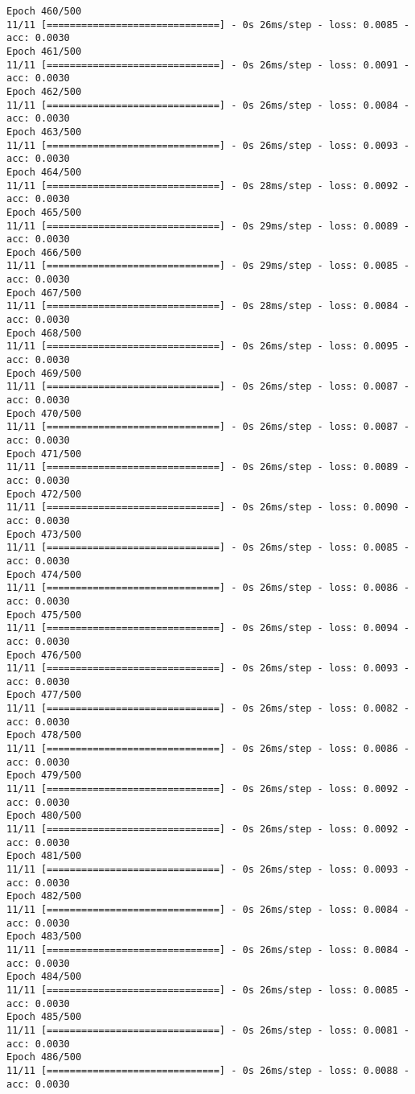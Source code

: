 \documentclass[11pt]{article}
\begin{document}
\begin{Verbatim}[commandchars=\\\{\}]
Epoch 460/500
11/11 [==============================] - 0s 26ms/step - loss: 0.0085 - acc: 0.0030
Epoch 461/500
11/11 [==============================] - 0s 26ms/step - loss: 0.0091 - acc: 0.0030
Epoch 462/500
11/11 [==============================] - 0s 26ms/step - loss: 0.0084 - acc: 0.0030
Epoch 463/500
11/11 [==============================] - 0s 26ms/step - loss: 0.0093 - acc: 0.0030
Epoch 464/500
11/11 [==============================] - 0s 28ms/step - loss: 0.0092 - acc: 0.0030
Epoch 465/500
11/11 [==============================] - 0s 29ms/step - loss: 0.0089 - acc: 0.0030
Epoch 466/500
11/11 [==============================] - 0s 29ms/step - loss: 0.0085 - acc: 0.0030
Epoch 467/500
11/11 [==============================] - 0s 28ms/step - loss: 0.0084 - acc: 0.0030
Epoch 468/500
11/11 [==============================] - 0s 26ms/step - loss: 0.0095 - acc: 0.0030
Epoch 469/500
11/11 [==============================] - 0s 26ms/step - loss: 0.0087 - acc: 0.0030
Epoch 470/500
11/11 [==============================] - 0s 26ms/step - loss: 0.0087 - acc: 0.0030
Epoch 471/500
11/11 [==============================] - 0s 26ms/step - loss: 0.0089 - acc: 0.0030
Epoch 472/500
11/11 [==============================] - 0s 26ms/step - loss: 0.0090 - acc: 0.0030
Epoch 473/500
11/11 [==============================] - 0s 26ms/step - loss: 0.0085 - acc: 0.0030
Epoch 474/500
11/11 [==============================] - 0s 26ms/step - loss: 0.0086 - acc: 0.0030
Epoch 475/500
11/11 [==============================] - 0s 26ms/step - loss: 0.0094 - acc: 0.0030
Epoch 476/500
11/11 [==============================] - 0s 26ms/step - loss: 0.0093 - acc: 0.0030
Epoch 477/500
11/11 [==============================] - 0s 26ms/step - loss: 0.0082 - acc: 0.0030
Epoch 478/500
11/11 [==============================] - 0s 26ms/step - loss: 0.0086 - acc: 0.0030
Epoch 479/500
11/11 [==============================] - 0s 26ms/step - loss: 0.0092 - acc: 0.0030
Epoch 480/500
11/11 [==============================] - 0s 26ms/step - loss: 0.0092 - acc: 0.0030
Epoch 481/500
11/11 [==============================] - 0s 26ms/step - loss: 0.0093 - acc: 0.0030
Epoch 482/500
11/11 [==============================] - 0s 26ms/step - loss: 0.0084 - acc: 0.0030
Epoch 483/500
11/11 [==============================] - 0s 26ms/step - loss: 0.0084 - acc: 0.0030
Epoch 484/500
11/11 [==============================] - 0s 26ms/step - loss: 0.0085 - acc: 0.0030
Epoch 485/500
11/11 [==============================] - 0s 26ms/step - loss: 0.0081 - acc: 0.0030
Epoch 486/500
11/11 [==============================] - 0s 26ms/step - loss: 0.0088 - acc: 0.0030

\end{Verbatim}
\end{document}
